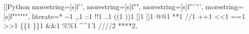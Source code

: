 []{Python}{%
    morestring=[s]{f'}{'},%
    morestring=[s]{f"}{"},%
    morestring=[s]{f'''}{'''},%
    morestring=[s]{f"""}{"""},%
    literate=*%
        {-}{\textcolor{Operator}{-}}{1}%
        {,}{\textcolor{Operator}{,}}{1}%
        {:}{\textcolor{Operator}{:}}{1}%
        {!}{\textcolor{Operator}{!}}{1}%
        {.}{\textcolor{Operator}{.}}{1}%
        {(}{\textcolor{Operator}{(}}{1}%
        {)}{\textcolor{Operator}{)}}{1}%
        {[}{\textcolor{Operator}{[}}{1}%
        {]}{\textcolor{Operator}{]}}{1}%
        {@}{\textcolor{Operator}{@}}{1}%
        {*}{\textcolor{Operator}{*}}{1}%
        {/}{\textcolor{Operator}{/}}{1}%
        {+}{\textcolor{Operator}{+}}{1}%
        {<}{\textcolor{Operator}{<}}{1}%
        {=}{\textcolor{Operator}{=}}{1}%
        {>}{\textcolor{Operator}{>}}{1}%
        {\{}{\textcolor{Operator}{\{}}{1}%
        {\}}{\textcolor{Operator}{\}}}{1}%
        {\&}{\textcolor{Operator}{\&}}{1}%
        {\%}{\textcolor{Operator}{\%}}{1}%
        {\^}{\textcolor{Operator}{\^}}{1}%
        {\|}{\textcolor{Operator}{\|}}{1}%
        {//}{\textcolor{Operator}{//}}{2}%
        {**}{\textcolor{Operator}{**}}{2},%
}

